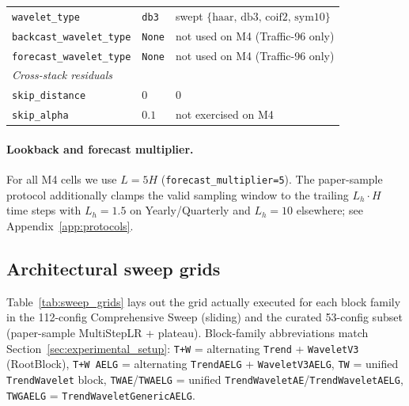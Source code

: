 \documentclass[11pt,a4paper]{article}
\begin{document}
\begin{table}[h]
\begin{tabular}{@{}lll@{}}
\texttt{wavelet\_type} & \texttt{db3} & swept $\{\text{haar},\,\text{db3},\,\text{coif2},\,\text{sym10}\}$ \\
\texttt{backcast\_wavelet\_type} & \texttt{None} & not used on M4 (Traffic-96 only) \\
\texttt{forecast\_wavelet\_type} & \texttt{None} & not used on M4 (Traffic-96 only) \\
\midrule
\multicolumn{3}{l}{\textit{Cross-stack residuals}} \\
\texttt{skip\_distance} & $0$ & $0$ \\
\texttt{skip\_alpha} & $0.1$ & not exercised on M4 \\
\bottomrule
\end{tabular}
\end{table}

\paragraph{Lookback and forecast multiplier.} For all M4 cells we use $L = 5H$ (\texttt{forecast\_multiplier=5}). The paper-sample protocol additionally clamps the valid sampling window to the trailing $L_h \cdot H$ time steps with $L_h = 1.5$ on Yearly/Quarterly and $L_h = 10$ elsewhere; see Appendix~\ref{app:protocols}.

\subsection{Architectural sweep grids}
\label{app:hyperparams:grids}

Table~\ref{tab:sweep_grids} lays out the grid actually executed for each block family in the 112-config Comprehensive Sweep (sliding) and the curated 53-config subset (paper-sample MultiStepLR + plateau). Block-family abbreviations match Section~\ref{sec:experimental_setup}: \texttt{T+W} = alternating \texttt{Trend} + \texttt{WaveletV3} (RootBlock), \texttt{T+W AELG} = alternating \texttt{TrendAELG} + \texttt{WaveletV3AELG}, \texttt{TW} = unified \texttt{TrendWavelet} block, \texttt{TWAE}/\texttt{TWAELG} = unified \texttt{TrendWaveletAE}/\texttt{TrendWaveletAELG}, \texttt{TWGAELG} = \texttt{TrendWaveletGenericAELG}.
\end{document}
